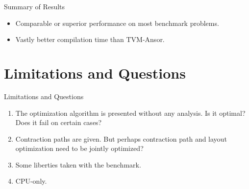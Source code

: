 \documentclass[aspectratio=169,10pt]{beamer}
\begin{document}
\begin{frame}{Summary of Results}
	\begin{itemize}
		\item Comparable or superior performance on most benchmark problems.
		\item Vastly better compilation time than TVM-Ansor.
	\end{itemize}
\end{frame}

\section{Limitations and Questions}

\begin{frame}{Limitations and Questions}
	\begin{enumerate}
		\item The optimization algorithm is presented without any analysis. Is it optimal? Does it fail on certain cases?
		\item Contraction paths are given. But perhaps contraction path and layout optimization need to be jointly optimized?
		\item Some liberties taken with the benchmark.
		\item CPU-only.
	\end{enumerate}
\end{frame}
\end{document}
